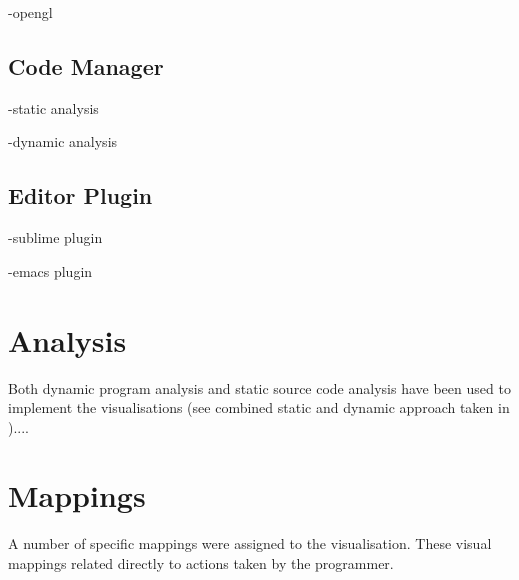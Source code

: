 -opengl

\subsection{Code Manager}

-static analysis

-dynamic analysis

\subsection{Editor Plugin}

-sublime plugin

-emacs plugin

\section{Analysis}

Both dynamic program analysis and static source code analysis have been used to implement the visualisations (see combined static and dynamic approach taken in \cite{Eisenbarth2003})....

\section{Mappings}

A number of specific mappings were assigned to the visualisation. These visual mappings related directly to actions taken by the programmer. 


